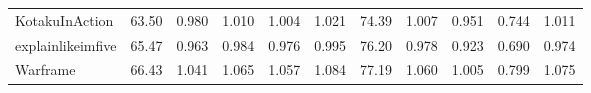 \begin{tabular}{lrrrrrrrrrr}
KotakuInAction      &         63.50 &               0.980 &               1.010 &               1.004 &               1.021 &                74.39 &                      1.007 &                      0.951 &                      0.744 &                      1.011 \\
explainlikeimfive   &         65.47 &               0.963 &               0.984 &               0.976 &               0.995 &                76.20 &                      0.978 &                      0.923 &                      0.690 &                      0.974 \\
Warframe            &         66.43 &               1.041 &               1.065 &               1.057 &               1.084 &                77.19 &                      1.060 &                      1.005 &                      0.799 &                      1.075 \\
\bottomrule
\end{tabular}

